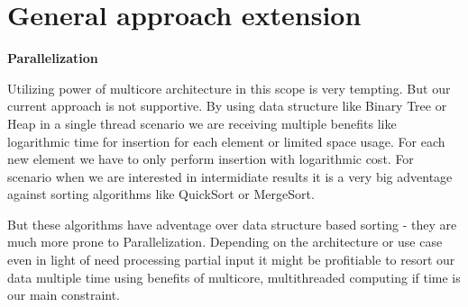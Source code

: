\section*{General approach extension}
\noindent \textbf{Parallelization}

Utilizing power of multicore architecture in this scope is very tempting.
But our current approach is not supportive. By using data structure like Binary Tree
or Heap in a single thread scenario we are receiving multiple benefits like logarithmic time 
for insertion for each element or limited space usage. For each new element we have to only perform
insertion with logarithmic cost. For scenario when we are interested in intermidiate results it is 
a very big adventage against sorting algorithms like QuickSort or MergeSort.

But these algorithms have adventage over data structure based sorting - they are much
more prone to Parallelization. Depending on the architecture or use case even in light 
of need processing partial input it might be profitiable to resort our data multiple
time using benefits of multicore, multithreaded computing if time is our main constraint.




